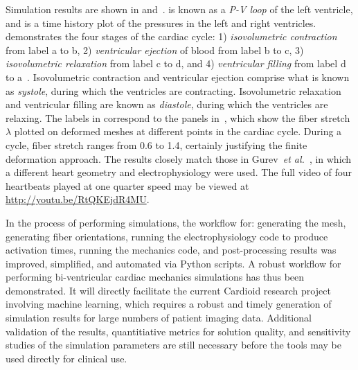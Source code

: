 Simulation results are shown in  and~.  is known as a \textit{P-V loop} of the left ventricle, and  is a time history plot of the pressures in the left and right ventricles.  demonstrates the four stages of the cardiac cycle: 1) \textit{isovolumetric contraction} from label a to b, 2) \textit{ventricular ejection} of blood from label b to c, 3) \textit{isovolumetric relaxation} from label c to d, and 4) \textit{ventricular filling} from label d to a~\cite{slideshare}. Isovolumetric contraction and ventricular ejection comprise what is known as \textit{systole}, during which the ventricles are contracting. Isovolumetric relaxation and ventricular filling are known as \textit{diastole}, during which the ventricles are relaxing. The labels in  correspond to the panels in~, which show the fiber stretch $\lambda$ plotted on deformed meshes at different points in the cardiac cycle. During a cycle, fiber stretch ranges from 0.6 to 1.4, certainly justifying the finite deformation approach. The results closely match those in Gurev~\textit{et al.}~\cite{gurev_2015}, in which a different heart geometry and electrophysiology were used. The full video of four heartbeats played at one quarter speed may be viewed at \href{http://youtu.be/RtQKEjdR4MU}{{\url{http://youtu.be/RtQKEjdR4MU}}}.

In the process of performing simulations, the workflow for: generating the mesh, generating fiber orientations, running the electrophysiology code to produce activation times, running the mechanics code, and post-processing results was improved, simplified, and automated via Python scripts. A robust workflow for performing bi-ventricular cardiac mechanics simulations has thus been demonstrated. It will directly facilitate the current Cardioid research project involving machine learning, which requires a robust and timely generation of simulation results for large numbers of patient imaging data. Additional validation of the results, quantitiative metrics for solution quality, and sensitivity studies of the simulation parameters are still necessary before the tools may be used directly for clinical use.


